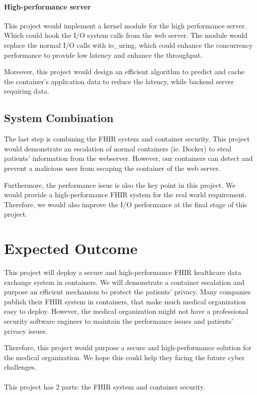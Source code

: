 \documentclass[12pt,a4paper]{article}
\begin{document}
\paragraph{High-performance server}
This project would implement a kernel module for the high performance server. Which could hook
the I/O system calls from the web server. The module would replace the normal I/O calls with
io\_uring, which could enhance the concurrency performance to provide low latency and enhance
the throughput.

Moreover, this project would design an efficient algorithm to predict and cache the container's
application data to reduce the latency, while backend server requiring data.

\subsection{System Combination}
The last step is combining the FHIR system and container security. This project would demonstrate
an escalation of normal containers (ie. Docker) to steal patients' information from the webserver.
However, our containers can detect and prevent a malicious user from escaping the container of the
web server.

Furthermore, the performance issue is also the key point in this project. We would provide a
high-performance FHIR system for the real world requirement. Therefore, we would also improve the
I/O performance at the final stage of this project.


\section{Expected Outcome}
This project will deploy a secure and high-performance FHIR healthcare data exchange system
in containers. We will demonstrate a container escalation and purpose an efficient mechanism
to protect the patients' privacy. Many companies publish their FHIR system in containers,
that make much medical organization easy to deploy. However, the medical organization might
not have a professional security software engineer to maintain the performance issues and
patients' privacy issues.

Therefore, this project would purpose a secure and high-performance solution for the medical
organization. We hope this could help they facing the future cyber challenges.
\paragraph{}
This project has 2 parts: the FHIR system and container security.
\end{document}
